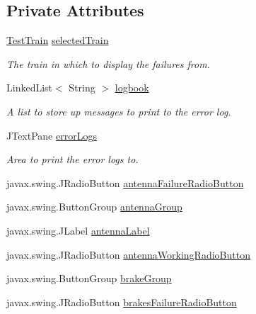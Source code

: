 \subsection*{Private Attributes}
\begin{DoxyCompactItemize}
\item 
\hyperlink{classTrainControllerComps_1_1TestTrain}{Test\+Train} \hyperlink{classTrainControllerComps_1_1TCFailures_a65fcb53be7a441d6ceec8872955ad8d7}{selected\+Train}
\begin{DoxyCompactList}\small\item\em The train in which to display the failures from. \end{DoxyCompactList}\item 
Linked\+List$<$ String $>$ \hyperlink{classTrainControllerComps_1_1TCFailures_a0c73c29afaca67760bd6b130ccbf2d4c}{logbook}
\begin{DoxyCompactList}\small\item\em A list to store up messages to print to the error log. \end{DoxyCompactList}\item 
J\+Text\+Pane \hyperlink{classTrainControllerComps_1_1TCFailures_a07b6a5403f60a1e2e6510836de30d906}{error\+Logs}
\begin{DoxyCompactList}\small\item\em Area to print the error logs to. \end{DoxyCompactList}\item 
javax.\+swing.\+J\+Radio\+Button \hyperlink{classTrainControllerComps_1_1TCFailures_ac74d2657306216535068bd17548b9661}{antenna\+Failure\+Radio\+Button}
\item 
javax.\+swing.\+Button\+Group \hyperlink{classTrainControllerComps_1_1TCFailures_a8c7e61b0b03ba87a123c5d9277b13af3}{antenna\+Group}
\item 
javax.\+swing.\+J\+Label \hyperlink{classTrainControllerComps_1_1TCFailures_a93e714edc703ad8ddb8ea9e869443ad7}{antenna\+Label}
\item 
javax.\+swing.\+J\+Radio\+Button \hyperlink{classTrainControllerComps_1_1TCFailures_a42b774e2408469ae3ba0d62839f88a42}{antenna\+Working\+Radio\+Button}
\item 
javax.\+swing.\+Button\+Group \hyperlink{classTrainControllerComps_1_1TCFailures_a6c7510f746275475950bf30eba68cae8}{brake\+Group}
\item 
javax.\+swing.\+J\+Radio\+Button \hyperlink{classTrainControllerComps_1_1TCFailures_af6a949a714e480c7895ea3bfc888a098}{brakes\+Failure\+Radio\+Button}

\end{DoxyCompactItemize}
